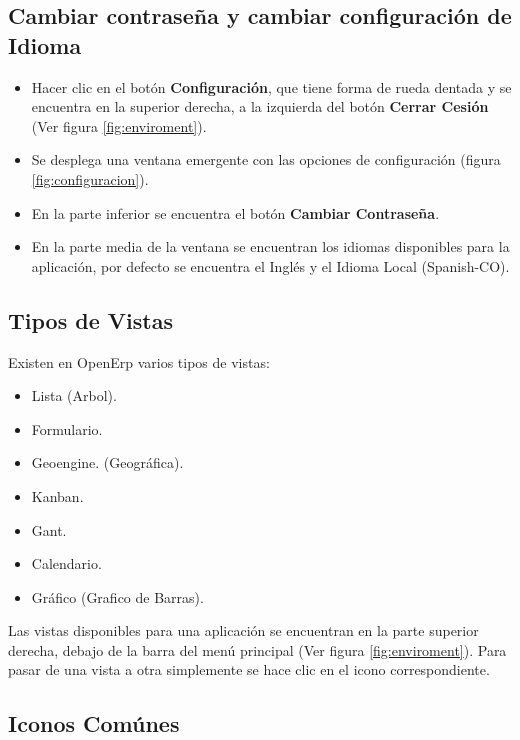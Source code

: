 \subsection {Cambiar contraseña y cambiar configuración de Idioma}
\begin{itemize}
 \item Hacer clic en el botón \textbf{Configuración}, que tiene forma de rueda dentada y se encuentra en la 
 superior derecha, a la izquierda del botón \textbf{Cerrar Cesión} (Ver figura \ref{fig:enviroment}).
 \item Se desplega una ventana emergente con las opciones de configuración (figura \ref{fig:configuracion}).
 \item En la parte inferior se encuentra el botón  \textbf{Cambiar Contraseña}.
 \item En la parte media de la ventana se encuentran los idiomas disponibles para la aplicación, por defecto
 se encuentra el Inglés y el Idioma Local (Spanish-CO). 
\end{itemize}


\subsection{Tipos de Vistas}
Existen en OpenErp varios tipos de vistas:
\begin{itemize}
 \item Lista (Arbol). 
 \item Formulario.
 \item Geoengine. (Geográfica).
 \item Kanban.
 \item Gant.
 \item Calendario.
 \item Gráfico (Grafico de Barras). 
\end{itemize}
Las vistas disponibles para una aplicación se encuentran en la parte superior derecha, debajo de la barra del menú principal
(Ver figura \ref{fig:enviroment}). Para pasar de una vista a otra simplemente se hace clic en el icono correspondiente.
\subsection{Iconos Comúnes}


